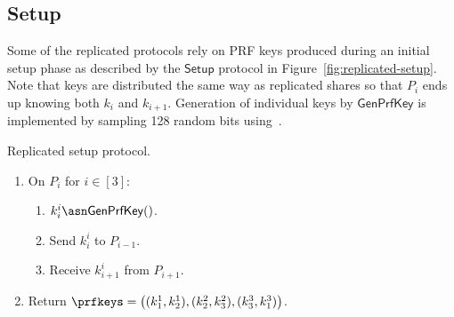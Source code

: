 \subsection{Setup}

Some of the replicated protocols rely on PRF keys produced during an initial
setup phase as described by the $\mathsf{Setup}$ protocol in
Figure~\ref{fig:replicated-setup}. Note that keys are distributed the same way
as replicated shares so that $P_i$ ends up knowing both $k_i$ and $k_{i+1}$.
Generation of individual keys by $\mathsf{GenPrfKey}$ is implemented by sampling
128 random bits using~\cite{libsodium}.

\label{fig:replicated-setup}
Replicated setup protocol.

  \begin{enumerate}
  \item On $P_i$ for $i \in [3]$:
  \begin{enumerate}
    \item $k^{i}_{i} \asn \mathsf{GenPrfKey}()$.
    \item Send $k^{i}_{i}$ to $P_{i-1}$.
    \item Receive $k^{i}_{i+1}$ from $P_{i+1}$.
  \end{enumerate}

  \item Return $\prfkeys = \left( (k^1_1, k^1_2), (k^2_2, k^2_3), (k^3_3, k^3_1) \right)$.
  \end{enumerate}

